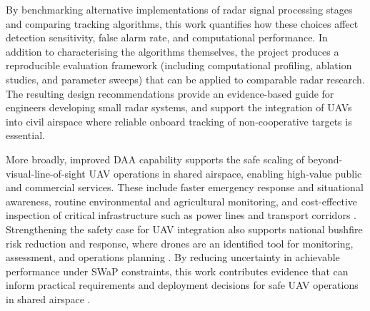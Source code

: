 By benchmarking alternative implementations of radar signal processing stages and comparing 
tracking algorithms, this work quantifies how these choices affect detection sensitivity, 
false alarm rate, and computational performance. In addition to characterising the algorithms 
themselves, the project produces a reproducible evaluation framework (including computational 
profiling, ablation studies, and parameter sweeps) that can be applied to comparable radar 
research. The resulting design recommendations provide an evidence-based guide for engineers 
developing small radar systems, and support the integration of UAVs into civil airspace where 
reliable onboard tracking of non-cooperative targets is essential.

More broadly, improved DAA capability supports the safe scaling of beyond-visual-line-of-sight 
UAV operations in shared airspace, enabling high-value public and commercial services. These 
include faster emergency response and situational awareness, routine environmental and 
agricultural monitoring, and cost-effective inspection of critical infrastructure such as 
power lines and transport corridors \cite{casa_bvlos_trial_2025}. Strengthening the safety 
case for UAV integration also supports national bushfire risk reduction and response, 
where drones are an identified tool for monitoring, assessment, and operations planning 
\cite{drones_gov_bushfire}. By reducing uncertainty in achievable performance under SWaP 
constraints, this work contributes evidence that can inform practical requirements and 
deployment decisions for safe UAV operations in shared airspace \cite{utm_action_plan_2024}.

\newpage
